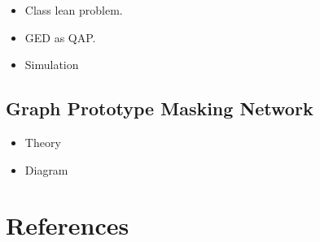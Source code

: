 \documentclass[
  11pt,
  letterpaper,
]{article}
\begin{document}
\begin{itemize}
\item
  Class lean problem.
\item
  GED as QAP.
\item
  Simulation
\end{itemize}

\hypertarget{graph-prototype-masking-network}{%
\subsection{Graph Prototype Masking
Network}\label{graph-prototype-masking-network}}

\begin{itemize}
\item
  Theory
\item
  Diagram
\end{itemize}

\pagebreak

\hypertarget{references}{%
\section*{References}\label{references}}
\end{document}
